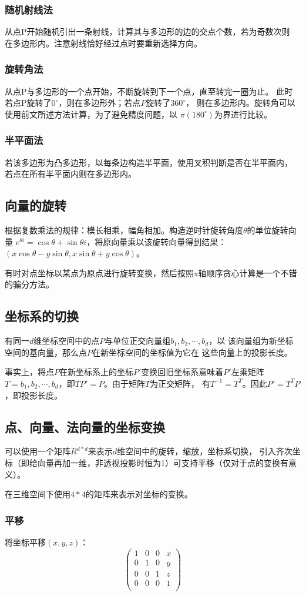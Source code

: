 \subsubsection{随机射线法}
从点P开始随机引出一条射线，计算其与多边形的边的交点个数，若为奇数次则
在多边形内。注意射线恰好经过点时要重新选择方向。
\subsubsection{旋转角法}
从点P与多边形的一个点开始，不断旋转到下一个点，直至转完一圈为止。
此时若点P旋转了$0^\circ$，则在多边形外；若点$P$旋转了$360^\circ$，
则在多边形内。旋转角可以使用前文所述方法计算，为了避免精度问题，以
$\pi(180^\circ)$为界进行比较。
\subsubsection{半平面法}
若该多边形为凸多边形，以每条边构造半平面，使用叉积判断是否在半平面内，
若点在所有半平面内则在多边形内。
\subsection{向量的旋转}
根据复数乘法的规律：模长相乘，幅角相加。构造逆时针旋转角度$\theta$的单位旋转向量
$e^{\theta i}=\cos \theta+\sin \theta i$，将原向量乘以该旋转向量得到结果：
$(x\cos \theta-y\sin \theta,x\sin \theta+y\cos \theta)$。

有时对点坐标以某点为原点进行旋转变换，然后按照x轴顺序贪心计算是一个不错的骗分方法。
\subsection{坐标系的切换}
有同一$d$维坐标空间中的点$P$与单位正交向量组$b_1,b_2,\cdots,b_d$，以
该向量组为新坐标空间的基向量，那么点$P$在新坐标空间的坐标值为它在
这些向量上的投影长度。

事实上，将点$P$在新坐标系上的坐标$P'$变换回旧坐标系意味着$P'$左乘矩阵
$T={b_1,b_2,\cdots,b_d}$，即$TP'=P$。由于矩阵$T$为正交矩阵，
有$T^{-1}=T^T$。因此$P'=T^TP$，即投影长度。
\subsection{点、向量、法向量的坐标变换}
可以使用一个矩阵$R^{d*d}$来表示$d$维空间中的旋转，缩放，坐标系切换，
引入齐次坐标（即给向量再加一维，非透视投影时恒为1）可支持平移（仅对于点的变换有意义）。

在三维空间下使用$4*4$的矩阵来表示对坐标的变换。

\subsubsection{平移}
将坐标平移$(x,y,z)$：
\begin{displaymath}
	\left(\begin{array}{cccc}
		1 & 0 & 0 & x \\
		0 & 1 & 0 & y \\
		0 & 0 & 1 & z \\
		0 & 0 & 0 & 1 \\
	\end{array}\right)
\end{displaymath}

